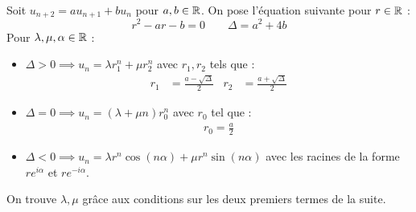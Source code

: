 \begin{theorem}
	Soit $u_{n+2} = a u_{n+1} + b u_n$ pour $a, b \in \mathbb{R}$.
	On pose l'équation suivante pour $r \in \mathbb{R}$ :
	\[ r^2 - ar - b = 0 \qquad \Delta = a^2 + 4b \]
	Pour $\lambda, \mu, \alpha \in \mathbb{R}$ :
	\begin{itemize}
        \item $\Delta > 0 \implies u_n = \lambda r_1^n + \mu r_2^n$ avec $r_1, r_2$ tels que :
        \begin{align*}
            r_1 &= \frac{a - \sqrt{\Delta}}{2} & r_2 &= \frac{a + \sqrt{\Delta}}{2}
        \end{align*}
        \item $\Delta = 0 \implies u_n = (\lambda + \mu n) r_0^n$ avec $r_0$ tel que :
        \begin{align*}
            r_0 = \frac{a}{2}
        \end{align*}
        \item $\Delta < 0 \implies u_n = \lambda r^n \cos(n \alpha) + \mu r^n \sin(n \alpha)$ avec les racines de la forme $re^{i\alpha}$ et $re^{-i\alpha}$.
    \end{itemize}    
    On trouve $\lambda, \mu$ grâce aux conditions sur les deux premiers termes de la suite.
\end{theorem}
